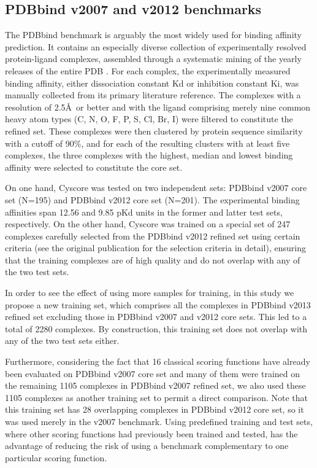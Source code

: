 \documentclass[journal=jacsat,manuscript=article]{achemso}
\begin{document}
\subsection{PDBbind v2007 and v2012 benchmarks}

The PDBbind benchmark is arguably the most widely used for binding affinity prediction. It contains an especially diverse collection of experimentally resolved protein-ligand complexes, assembled through a systematic mining of the yearly releases of the entire PDB \cite{540,537}. For each complex, the experimentally measured binding affinity, either dissociation constant Kd or inhibition constant Ki, was manually collected from its primary literature reference. The complexes with a resolution of 2.5\AA\ or better and with the ligand comprising merely nine common heavy atom types (C, N, O, F, P, S, Cl, Br, I) were filtered to constitute the refined set. These complexes were then clustered by protein sequence similarity with a cutoff of 90\%, and for each of the resulting clusters with at least five complexes, the three complexes with the highest, median and lowest binding affinity were selected to constitute the core set.

On one hand, Cyscore was tested on two independent sets: PDBbind v2007 core set (N=195) and PDBbind v2012 core set (N=201). The experimental binding affinities span 12.56 and 9.85 pKd units in the former and latter test sets, respectively. On the other hand, Cyscore was trained on a special set of 247 complexes carefully selected from the PDBbind v2012 refined set using certain criteria (see the original publication \cite{1372} for the selection criteria in detail), ensuring that the training complexes are of high quality and do not overlap with any of the two test sets.

In order to see the effect of using more samples for training, in this study we propose a new training set, which comprises all the complexes in PDBbind v2013 refined set excluding those in PDBbind v2007 and v2012 core sets. This led to a total of 2280 complexes. By construction, this training set does not overlap with any of the two test sets either.

Furthermore, considering the fact that 16 classical scoring functions have already been evaluated \cite{1313} on PDBbind v2007 core set and many of them were trained on the remaining 1105 complexes in PDBbind v2007 refined set, we also used these 1105 complexes as another training set to permit a direct comparison. Note that this training set has 28 overlapping complexes in PDBbind v2012 core set, so it was used merely in the v2007 benchmark. Using predefined training and test sets, where other scoring functions had previously been trained and tested, has the advantage of reducing the risk of using a benchmark complementary to one particular scoring function.
\end{document}
